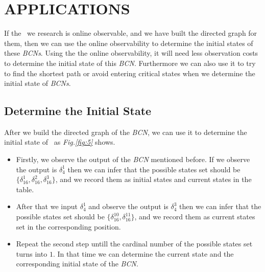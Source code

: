 \section{APPLICATIONS}

If the \BCNs\ we research is online observable, and we have built the directed graph for them, then we can use the online observability to determine the initial states of these {\em BCNs}. Using the the online observability, it will need less observation costs to determine the initial state of this {\em BCN}. Furthermore we can also use it to try to find the shortest path or avoid entering critical states when we determine the initial state of {\em BCNs}. %

\subsection{Determine the Initial State}

After we build the directed graph of the {\em BCN}, we can use it to determine the initial state of \BCNs\ as {\em Fig.\ref{fig:5}} shows. 
\begin{itemize}
  \item Firstly, we observe the output of the {\em BCN} mentioned before. If we observe the output is $\delta_4^1$ then we can infer that the possible states set should be $\{\delta_{16}^1,\delta_{16}^2,\delta_{16}^3\}$, and we record them as initial states and current states in the table. 
  \item After that we input  $\delta_4^1$ and observe the output is $\delta_4^3$ then we can infer that the possible states set should be $\{\delta_{16}^{10},\delta_{16}^{11}\}$, and we record them as current states set in the corresponding position. 
 \item Repeat the second step untill the cardinal number of the possible states set turns into $1$. In that time we can determine the current state and the corresponding initial state of the {\em BCN}.
\end{itemize} 

